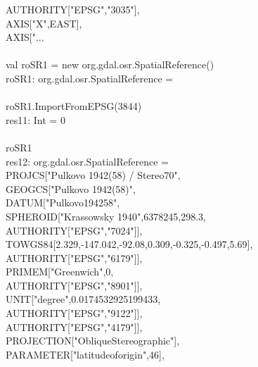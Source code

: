 \documentclass {article}
\begin{document}
\hspace*{2mm} AUTHORITY["EPSG","3035"],\\
\hspace*{2mm} AXIS["X",EAST],\\
\hspace*{2mm} AXIS["...\\
\\
val roSR1 = new org.gdal.osr.SpatialReference()\\
roSR1: org.gdal.osr.SpatialReference = \\
\\
roSR1.ImportFromEPSG(3844) \\
res11: Int = 0 \\
\\
roSR1\\
res12: org.gdal.osr.SpatialReference = \\
PROJCS["Pulkovo 1942(58) / Stereo70",\\
\hspace*{2mm} GEOGCS["Pulkovo 1942(58)",\\
\hspace*{4mm} DATUM["Pulkovo\underline{\space}1942\underline{\space}58",\\
\hspace*{6mm} SPHEROID["Krassowsky 1940",6378245,298.3,\\
\hspace*{8mm} AUTHORITY["EPSG","7024"]],\\
\hspace*{6mm} TOWGS84[2.329,-147.042,-92.08,0.309,-0.325,-0.497,5.69],\\
\hspace*{6mm} AUTHORITY["EPSG","6179"]],\\
\hspace*{4mm} PRIMEM["Greenwich",0,\\
\hspace*{6mm} AUTHORITY["EPSG","8901"]],\\
\hspace*{4mm} UNIT["degree",0.0174532925199433,\\
\hspace*{6mm} AUTHORITY["EPSG","9122"]],\\
\hspace*{4mm} AUTHORITY["EPSG","4179"]],\\
\hspace*{2mm} PROJECTION["Oblique\underline{\space}Stereographic"],\\
\hspace*{2mm} PARAMETER["latitude\underline{\space}of\underline{\space}origin",46],\\
\end{document}
